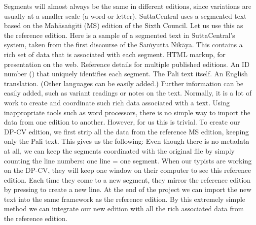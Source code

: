 {}Segments will almost always be the same in different editions, since variations are usually at a smaller scale (a word or letter).\markdownRendererInterblockSeparator
{}SuttaCentral uses a segmented text based on the Mahāsaṅgīti (MS) edition of the Sixth Council. Let us use this as the reference edition. Here is a sample of a segmented text in SuttaCentral’s system, taken from the first discourse of the Saṁyutta Nikāya.\markdownRendererInterblockSeparator
{}\markdownRendererInterblockSeparator
{}This contains a rich set of data that is associated with each segment.\markdownRendererInterblockSeparator
{}\markdownRendererOlBegin
{}HTML markup, for presentation on the web.\markdownRendererOlItemEnd 
{}Reference details for multiple published editions.\markdownRendererOlItemEnd 
{}An ID number () that uniquely identifies each segment.\markdownRendererOlItemEnd 
{}The Pali text itself.\markdownRendererOlItemEnd 
{}An English translation. (Other languages can be easily added.)\markdownRendererOlItemEnd 
\markdownRendererOlEnd \markdownRendererInterblockSeparator
{}Further information can be easily added, such as variant readings or notes on the text.\markdownRendererInterblockSeparator
{}Normally, it is a lot of work to create and coordinate such rich data associated with a text. Using inappropriate tools such as word processors, there is no simple way to import the data from one edition to another. However, for us this is trivial. To create our DP-CV edition, we first strip all the data from the reference MS edition, keeping only the Pali text. This gives us the following:\markdownRendererInterblockSeparator
{}\markdownRendererInterblockSeparator
{}Even though there is no metadata at all, we can keep the segments coordinated with the original file by simply counting the line numbers: one line = one segment.\markdownRendererInterblockSeparator
{}When our typists are working on the DP-CV, they will keep one window on their computer to see this reference edition. Each time they come to a new segment, they mirror the reference edition by pressing to create a new line. At the end of the project we can import the new text into the same framework as the reference edition. By this extremely simple method we can integrate our new edition with all the rich associated data from the reference edition.\markdownRendererInterblockSeparator
